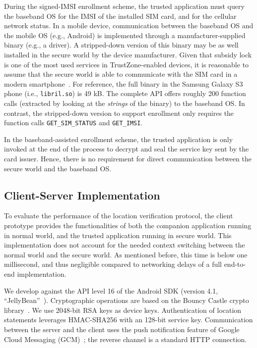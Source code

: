 During the signed-IMSI enrollment scheme, the trusted application must query the
baseband OS for the IMSI of the installed SIM card, and for the cellular network
status.  In a mobile device, communication between the baseband OS and the
mobile OS (e.g., Android) is implemented through a manufacturer-supplied binary
(e.g., a driver). A stripped-down version of this binary may be as well
installed in the secure world by the device manufacturer. Given that subsidy
lock is one of the most used services in TrustZone-enabled devices, it is
reasonable to assume that the secure world is able to communicate with the SIM
card in a modern smartphone~\cite{kostiainen2011codaspy}. For reference, the
full binary in the Samsung Galaxy S3 phone (i.e., \texttt{libril.so}) is 49 kB.
The complete API offers roughly 200 function calls (extracted by looking at the
\emph{strings} of the binary) to the baseband OS.  In contrast, the
stripped-down version to support enrollment only requires the function calls
\texttt{GET\_SIM\_STATUS} and \texttt{GET\_IMSI}.

In the baseband-assisted enrollment scheme, the trusted application is only
invoked at the end of the process to decrypt and seal the service key sent by
the card issuer. Hence, there is no requirement for direct communication between
the secure world and the baseband OS.

\subsection{Client-Server Implementation}

To evaluate the performance of the location verification protocol, the client
prototype provides the functionalities of both the companion application running
in normal world, and the trusted application running in secure world. This
implementation does not account for the needed context switching between the
normal world and the secure world. As mentioned before, this time is below one
millisecond, and thus negligible compared to networking delays of a full
end-to-end implementation.

We develop against the API level 16 of the Android SDK (version 4.1, ``JellyBean''~\cite{androidjb}).  Cryptographic operations are based on the Bouncy
Castle crypto library~\cite{bouncycastle}.  We use 2048-bit RSA keys as device
keys.  Authentication of location statements leverages HMAC-SHA256 with an
128-bit service key.  Communication between the server and the client uses the
push notification feature of Google Cloud Messaging (GCM)~\cite{gcm};
the reverse channel is a standard HTTP connection.

